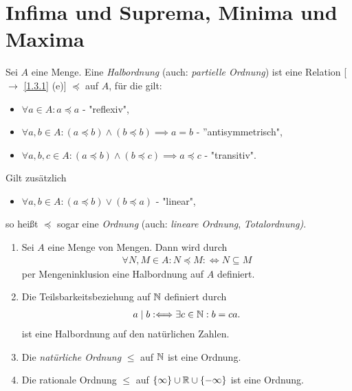 \documentclass[../../main.tex]{subfiles}
\begin{document}
\section{Infima und Suprema, Minima und Maxima}

\begin{df}\label{12.1.1}
 Sei $A$ eine Menge. Eine \emph{Halbordnung} (auch: \emph{partielle Ordnung}) ist eine Relation [$\to$ \ref{1.3.1} (e)] $\preceq$ auf $A$, für die gilt:
\begin{itemize}
\item $\forall a\in A: a\preceq a$ - "reflexiv",
\item $\forall a,b\in A: (a\preceq b)\land (b\preceq b)\implies a=b$ - ''antisymmetrisch",
\item $\forall a,b,c\in A: (a\preceq b)\land (b\preceq c)\implies a\preceq c$ - "transitiv".
\end{itemize}
Gilt zusätzlich
\begin{itemize}
\item $\forall a,b\in A: (a\preceq b)\lor (b\preceq a)$ - "linear",
\end{itemize}
so heißt $\preceq$ sogar eine \emph{Ordnung} (auch: \textit{lineare Ordnung}, \emph{Totalordnung)}.\\
\end{df}

\begin{bsp}\label{12.1.2}
\begin{enumerate}[\normalfont(a)]
\item Sei $A$ eine Menge von Mengen. Dann wird durch
\begin{align*}
\forall N,M\in A: N\preceq M:\Longleftrightarrow N\subseteq M
\end{align*}
per Mengeninklusion eine Halbordnung auf $A$ definiert.
\item Die Teilsbarkeitsbeziehung auf $\mathbb N$ definiert durch
\begin{align*}
a\mid b:\Longleftrightarrow \exists c\in \mathbb N: b=ca.
\end{align*}
ist eine Halbordnung auf den natürlichen Zahlen.
 				
\item Die \emph{natürliche Ordnung} $\le$ auf $\mathbb N$ ist eine Ordnung.
\item Die rationale Ordnung $\le$ auf $\{\infty\}\cup\mathbb R\cup\{-\infty\}$ ist eine Ordnung.
\end{enumerate}
\end{bsp}
\end{document}
